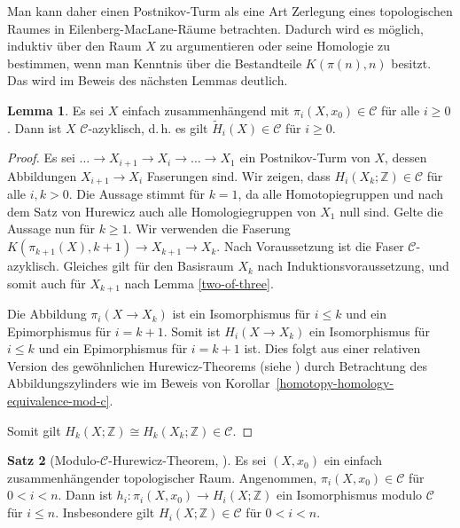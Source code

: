 \documentclass[11pt, a4paper, german]{article}
\theoremstyle{definition}
\newtheorem{lem}{Lemma}
\newtheorem{satz}[lem]{Satz}
\theoremstyle{remark}
\newcommand{\Z}{\mathbb{Z}} %
\newcommand{\SC}{\mathcal{C}} %
\renewcommand{\dh}{d.\,h.} %
\begin{document}
Man kann daher einen Postnikov-Turm als eine Art Zerlegung eines topologischen Raumes in Eilenberg-MacLane-Räume betrachten.
Dadurch wird es möglich, induktiv über den Raum $X$ zu argumentieren oder seine Homologie zu bestimmen, wenn man Kenntnis über die Bestandteile $K(\pi(n), n)$ besitzt.
Das wird im Beweis des nächsten Lemmas deutlich.

\begin{lem}\label{homotopy-in-c-implies-homology-in-c}
  Es sei $X$ einfach zusammenhängend mit $\pi_i(X, x_0) \in \SC$ für alle $i \geq 0$.
  Dann ist $X$ $\SC$-azyklisch, \dh{} es gilt $\tilde{H}_i(X) \in \SC$ für $i \geq 0$.
\end{lem}

\begin{proof}
  Es sei $\ldots \to X_{i+1} \to X_i \to \ldots \to X_1$ ein Postnikov-Turm von $X$, dessen Abbildungen $X_{i+1} \to X_i$ Faserungen sind.
  Wir zeigen, dass $H_i(X_k; \Z) \in \SC$ für alle $i, k > 0$.
  Die Aussage stimmt für $k = 1$, da alle Homotopiegruppen und nach dem Satz von Hurewicz auch alle Homologiegruppen von $X_1$ null sind.
  Gelte die Aussage nun für $k \geq 1$.
  Wir verwenden die Faserung $K(\pi_{k+1}(X), k{+}1) \to X_{k+1} \to X_k$.
  Nach Voraussetzung ist die Faser $\SC$-azyklisch.
  Gleiches gilt für den Basisraum $X_k$ nach Induktionsvoraussetzung,
  und somit auch für $X_{k+1}$ nach Lemma \ref{two-of-three}.

  Die Abbildung $\pi_i(X \to X_k)$ ist ein Isomorphismus für $i \leq k$ und ein Epimorphismus für $i = k+1$.
  Somit ist $H_i(X \to X_k)$ ein Isomorphismus für $i \leq k$ und ein Epimorphismus für $i = k+1$ ist.
  Dies folgt aus einer relativen Version des gewöhnlichen Hurewicz-Theorems (siehe \cite[Thm 4.32]{hatcher:at}) durch Betrachtung des Abbildungszylinders wie im Beweis von Korollar~\ref{homotopy-homology-equivalence-mod-c}.

  Somit gilt $H_k(X; \Z) \cong H_k(X_k; \Z) \in \SC$.
\end{proof}

\begin{satz}[Modulo-$\SC$-Hurewicz-Theorem, {\cite[Thm 1.8]{hatcher:ss}}]\label{hurewicz-mod-c}
  Es sei $(X, x_0)$ ein einfach zusammenhängender topologischer Raum.
  Angenommen, $\pi_i(X, x_0) \in \SC$ für $0 < i < n$.
  Dann ist $h_i : \pi_i(X, x_0) \to H_i(X; \Z)$ ein Isomorphismus modulo $\SC$ für $i \leq n$.
  Insbesondere gilt $H_i(X; \Z) \in \SC$ für $0 < i < n$.
\end{satz}
\end{document}
